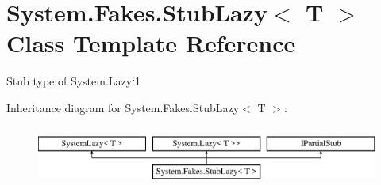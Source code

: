\hypertarget{class_system_1_1_fakes_1_1_stub_lazy_3_01_t_01_4}{\section{System.\-Fakes.\-Stub\-Lazy$<$ T $>$ Class Template Reference}
\label{class_system_1_1_fakes_1_1_stub_lazy_3_01_t_01_4}
}


Stub type of System.\-Lazy`1 


Inheritance diagram for System.\-Fakes.\-Stub\-Lazy$<$ T $>$\-:\begin{figure}[H]
\begin{center}
\leavevmode
\includegraphics[height=2.000000cm]{class_system_1_1_fakes_1_1_stub_lazy_3_01_t_01_4}
\end{center}
\end{figure}
